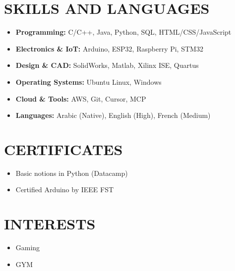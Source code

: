 \documentclass[a4paper,9pt]{extarticle}
\begin{document}
\section*{SKILLS AND LANGUAGES}
\begin{itemize}
    \item \textbf{Programming:} C/C++, Java, Python, SQL, HTML/CSS/JavaScript
    \item \textbf{Electronics \& IoT:} Arduino, ESP32, Raspberry Pi, STM32
    \item \textbf{Design \& CAD:} SolidWorks, Matlab, Xilinx ISE, Quartus
    \item \textbf{Operating Systems:} Ubuntu Linux, Windows
    \item \textbf{Cloud \& Tools:} AWS, Git, Cursor, MCP
    \item \textbf{Languages:} Arabic (Native), English (High), French (Medium)
\end{itemize}

\section*{CERTIFICATES}
\begin{itemize}
    \item Basic notions in Python (Datacamp)
    \item Certified Arduino by IEEE FST
\end{itemize}

\section*{INTERESTS}
\begin{itemize}
    \item Gaming
    \item GYM
\end{itemize}


\end{document}

